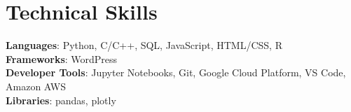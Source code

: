 \documentclass[a4paper,11pt]{article}
\begin{document}
%
\iftrue
\section{Technical Skills}
 \begin{itemize}[leftmargin=0.15in, label={}]
    \small{\item{
     \textbf{Languages}{: Python, C/C++, SQL, JavaScript, HTML/CSS, R} \\
     \textbf{Frameworks}{: WordPress} \\
     \textbf{Developer Tools}{: Jupyter Notebooks, Git, Google Cloud Platform, VS Code, Amazon AWS} \\
     \textbf{Libraries}{: pandas, plotly}
    }}
 \end{itemize}
\fi

\end{document}
